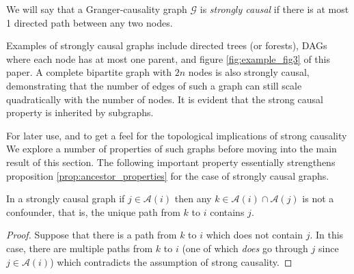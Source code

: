 \documentclass[12pt]{article}
\def\gcg{\mathcal{G}}  %
\newcommand{\anc}[1]{\mathcal{A}(#1)}  %
\begin{document}
\begin{definition}
  \label{def:strongly_causal}
  We will say that a Granger-causality graph $\gcg$ is
  \textit{strongly causal} if there is at most 1 directed path between
  any two nodes.
\end{definition}

Examples of strongly causal graphs include directed trees (or
forests), DAGs where each node has at most one parent, and figure
\ref{fig:example_fig3} of this paper.  A complete bipartite graph with
$2n$ nodes is also strongly causal, demonstrating that the number of
edges of such a graph can still scale quadratically with the number of
nodes.  It is evident that the strong causal property is inherited by
subgraphs.


For later use, and to get a feel for the topological implications of
strong causality We explore a number of properties of such graphs
before moving into the main result of this section.  The following
important property essentially strengthens proposition
\ref{prop:ancestor_properties} for the case of strongly causal graphs.

\begin{proposition}
  \label{prop:sc_graph_common_anc}
  In a strongly causal graph if $j \in \anc{i}$ then any
  $k \in \anc{i} \cap \anc{j}$ is not a confounder, that is,
  the unique path from $k$ to $i$ contains $j$.
\end{proposition}
\begin{proof}
  Suppose that there is a path from $k$ to $i$ which does not contain
  $j$.  In this case, there are multiple paths from $k$ to $i$ (one of
  which \textit{does} go through $j$ since $j \in \anc{i}$) which
  contradicts the assumption of strong causality.
\end{proof}

  
\end{document}

